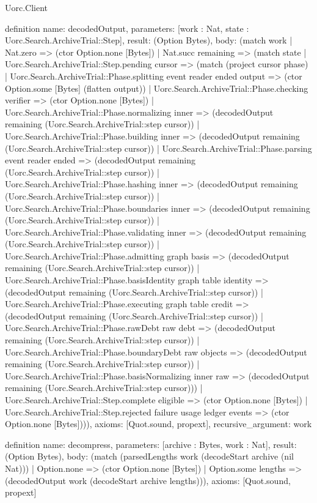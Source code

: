 \begin{lexlean}{Uorc.Client}
\begin{semanticmodule}
definition{
  name: decodedOutput,
  parameters: [work : Nat, state : Uorc.Search.ArchiveTrial::Step],
  result: (Option Bytes),
  body: (match work
    | Nat.zero => (ctor Option.none [Bytes])
    | Nat.succ remaining => (match state
      | Uorc.Search.ArchiveTrial::Step.pending cursor => (match (project cursor phase)
        | Uorc.Search.ArchiveTrial::Phase.splitting event reader ended output => (ctor Option.some [Bytes] (flatten output))
        | Uorc.Search.ArchiveTrial::Phase.checking verifier => (ctor Option.none [Bytes])
        | Uorc.Search.ArchiveTrial::Phase.normalizing inner => (decodedOutput remaining (Uorc.Search.ArchiveTrial::step cursor))
        | Uorc.Search.ArchiveTrial::Phase.building inner => (decodedOutput remaining (Uorc.Search.ArchiveTrial::step cursor))
        | Uorc.Search.ArchiveTrial::Phase.parsing event reader ended => (decodedOutput remaining (Uorc.Search.ArchiveTrial::step cursor))
        | Uorc.Search.ArchiveTrial::Phase.hashing inner => (decodedOutput remaining (Uorc.Search.ArchiveTrial::step cursor))
        | Uorc.Search.ArchiveTrial::Phase.boundaries inner => (decodedOutput remaining (Uorc.Search.ArchiveTrial::step cursor))
        | Uorc.Search.ArchiveTrial::Phase.validating inner => (decodedOutput remaining (Uorc.Search.ArchiveTrial::step cursor))
        | Uorc.Search.ArchiveTrial::Phase.admitting graph basis => (decodedOutput remaining (Uorc.Search.ArchiveTrial::step cursor))
        | Uorc.Search.ArchiveTrial::Phase.basisIdentity graph table identity => (decodedOutput remaining (Uorc.Search.ArchiveTrial::step cursor))
        | Uorc.Search.ArchiveTrial::Phase.executing graph table credit => (decodedOutput remaining (Uorc.Search.ArchiveTrial::step cursor))
        | Uorc.Search.ArchiveTrial::Phase.rawDebt raw debt => (decodedOutput remaining (Uorc.Search.ArchiveTrial::step cursor))
        | Uorc.Search.ArchiveTrial::Phase.boundaryDebt raw objects => (decodedOutput remaining (Uorc.Search.ArchiveTrial::step cursor))
        | Uorc.Search.ArchiveTrial::Phase.basisNormalizing inner raw => (decodedOutput remaining (Uorc.Search.ArchiveTrial::step cursor)))
      | Uorc.Search.ArchiveTrial::Step.complete eligible => (ctor Option.none [Bytes])
      | Uorc.Search.ArchiveTrial::Step.rejected failure usage ledger events => (ctor Option.none [Bytes]))),
  axioms: [Quot.sound, propext],
  recursive_argument: work
}

definition{
  name: decompress,
  parameters: [archive : Bytes, work : Nat],
  result: (Option Bytes),
  body: (match (parsedLengths work (decodeStart archive (nil Nat)))
    | Option.none => (ctor Option.none [Bytes])
    | Option.some lengths => (decodedOutput work (decodeStart archive lengths))),
  axioms: [Quot.sound, propext]
}
\end{semanticmodule}
\end{lexlean}
